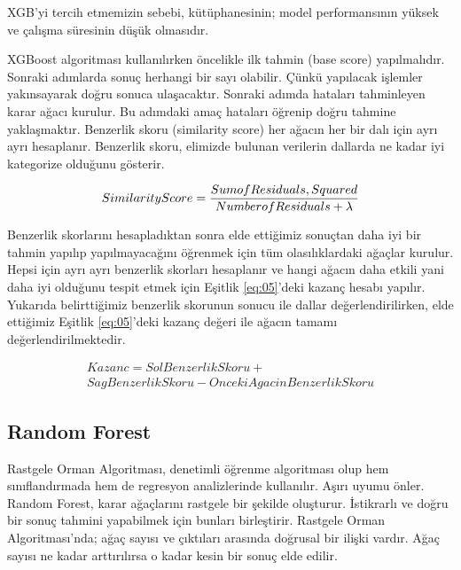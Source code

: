 \documentclass[conference]{IEEEtran}
\begin{document}
\quad XGB’yi tercih etmemizin sebebi, kütüphanesinin; model performansının yüksek ve çalışma süresinin düşük olmasıdır\cite{9}.

\quad XGBoost algoritması kullanılırken öncelikle ilk tahmin (base score) yapılmalıdır. Sonraki adımlarda sonuç herhangi bir sayı olabilir. Çünkü yapılacak işlemler yakınsayarak doğru sonuca ulaşacaktır. Sonraki adımda hataları tahminleyen karar ağacı kurulur. Bu adımdaki amaç hataları öğrenip doğru tahmine yaklaşmaktır. Benzerlik skoru (similarity score) her ağacın her bir dalı için ayrı ayrı hesaplanır. Benzerlik skoru, elimizde bulunan verilerin dallarda ne kadar iyi kategorize olduğunu gösterir\cite{10}.

\begin{equation}
\label{eq:04}
\large Similarity Score=\frac{Sum of Residuals, Squared}{Number of Residuals + \lambda}
\end{equation}

\quad Benzerlik skorlarını hesapladıktan sonra elde ettiğimiz sonuçtan daha iyi bir tahmin yapılıp yapılmayacağını öğrenmek için tüm olasılıklardaki ağaçlar kurulur. Hepsi için ayrı ayrı benzerlik skorları hesaplanır ve hangi ağacın daha etkili yani daha iyi olduğunu tespit etmek için Eşitlik \ref{eq:05}'deki kazanç hesabı yapılır\cite{10}. Yukarıda belirttiğimiz benzerlik skorunun sonucu ile dallar değerlendirilirken, elde ettiğimiz Eşitlik \ref{eq:05}'deki kazanç değeri ile ağacın tamamı değerlendirilmektedir\cite{10}.

\begin{equation}
\label{eq:05}
\begin{matrix} Kazanc=SolBenzerlikSkoru+ \\ SagBenzerlikSkoru-OncekiAgacinBenzerlikSkoru \end{matrix}
\end{equation}

\subsection{\textbf{Random Forest}}
\quad Rastgele Orman Algoritması, denetimli öğrenme algoritması olup hem sınıflandırmada hem de regresyon analizlerinde kullanılır. Aşırı uyumu önler. Random Forest, karar ağaçlarını rastgele bir şekilde oluşturur. İstikrarlı ve doğru bir sonuç tahmini yapabilmek için bunları birleştirir. Rastgele Orman Algoritması’nda; ağaç sayısı ve çıktıları arasında doğrusal bir ilişki vardır. Ağaç sayısı ne kadar arttırılırsa o kadar kesin bir sonuç elde edilir\cite{11}\cite{12}.
\end{document}
